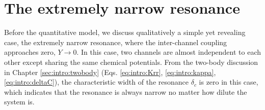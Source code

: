 \section{The extremely narrow resonance\label{sec:pathInt2:extremelyNR}}
Before the quantitative model, we discuss qualitatively a simple yet revealing case,   the extremely narrow resonance, where the inter-channel coupling approaches zero, $Y\rightarrow0$.  In this case, two channels are almost independent to each other except sharing the same chemical potentials.  From the two-body discussion in Chapter \ref{sec:intro:twobody} (Eqs. \ref{eq:intro:Krr}, \ref{eq:intro:kappa}, \ref{eq:intro:deltaC}), the characteristic width of the resonance $\delta_{c}$ is zero in this case, which indicates that the resonance is always narrow no matter how dilute the system is.  


